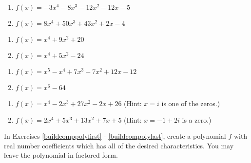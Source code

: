 \begin{multicols}{2}
\begin{enumerate}
\setcounter{enumi}{\value{HW}}

\item  $f(x) = -3x^4-8x^3-12x^2-12x-5$
\item  $f(x) = 8x^4+50x^3+43x^2+2x-4$


\setcounter{HW}{\value{enumi}}
\end{enumerate}
\end{multicols}

\begin{multicols}{2}
\begin{enumerate}
\setcounter{enumi}{\value{HW}}

\item $f(x) = x^4+9x^2+20$
\item $f(x) = x^4 + 5x^2 - 24$

\setcounter{HW}{\value{enumi}}
\end{enumerate}
\end{multicols}

\begin{multicols}{2}
\begin{enumerate}
\setcounter{enumi}{\value{HW}}

\item  $f(x) = x^5 - x^4+7x^3-7x^2+12x-12$
\item $f(x) = x^6-64$


\setcounter{HW}{\value{enumi}}
\end{enumerate}
\end{multicols}



\begin{enumerate}
\setcounter{enumi}{\value{HW}}

\item $f(x) = x^{4} - 2x^{3} + 27x^{2} - 2x + 26$ (Hint: $x = i$ is one of the zeros.)
\item  $f(x) = 2x^4+5x^3+13x^2+7x+5$ (Hint:  $x = -1+2i$ is a zero.) \label{compfactpolylast}

\setcounter{HW}{\value{enumi}}
\end{enumerate}

In Exercises \ref{buildcomppolyfirst} - \ref{buildcompolylast}, create a polynomial $f$ with real number coefficients which has all of the desired characteristics.  You may leave the polynomial in factored form. 

